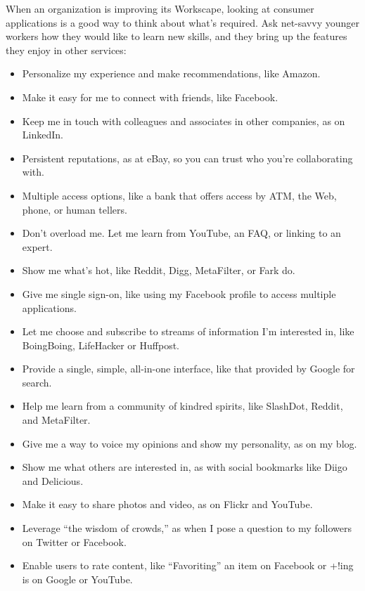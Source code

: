 When an organization is improving its Workscape, looking at consumer
applications is a good way to think about what's required. Ask net-savvy
younger workers how they would like to learn new skills, and they bring
up the features they enjoy in other services:

\begin{itemize}
\tightlist
\item
  Personalize my experience and make recommendations, like Amazon.
\item
  Make it easy for me to connect with friends, like Facebook.
\item
  Keep me in touch with colleagues and associates in other companies, as
  on LinkedIn.
\item
  Persistent reputations, as at eBay, so you can trust who you're
  collaborating with.
\item
  Multiple access options, like a bank that offers access by ATM, the
  Web, phone, or human tellers.
\item
  Don't overload me. Let me learn from YouTube, an FAQ, or linking to an
  expert.
\item
  Show me what's hot, like Reddit, Digg, MetaFilter, or Fark do.
\item
  Give me single sign-on, like using my Facebook profile to access
  multiple applications.
\item
  Let me choose and subscribe to streams of information I'm interested
  in, like BoingBoing, LifeHacker or Huffpost.
\item
  Provide a single, simple, all-in-one interface, like that provided by
  Google for search.
\item
  Help me learn from a community of kindred spirits, like SlashDot,
  Reddit, and MetaFilter.
\item
  Give me a way to voice my opinions and show my personality, as on my
  blog.
\item
  Show me what others are interested in, as with social bookmarks like
  Diigo and Delicious.
\item
  Make it easy to share photos and video, as on Flickr and YouTube.
\item
  Leverage ``the wisdom of crowds,'' as when I pose a question to my
  followers on Twitter or Facebook.
\item
  Enable users to rate content, like ``Favoriting'' an item on Facebook
  or +!ing is on Google or YouTube.
\end{itemize}

